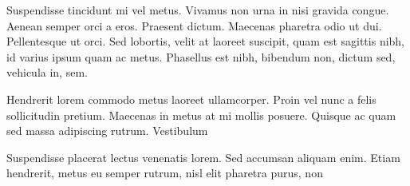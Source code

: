 \documentclass[article]{subfile}
\begin{document}

\begin{float}
	Suspendisse tincidunt mi vel metus. Vivamus non urna in nisi gravida congue. Aenean semper orci a eros. Praesent dictum. Maecenas pharetra odio ut dui. Pellentesque ut orci. Sed lobortis, velit at laoreet suscipit, quam est sagittis nibh, id varius ipsum quam ac metus. Phasellus est nibh, bibendum non, dictum sed, vehicula in, sem.


	Hendrerit lorem commodo metus laoreet ullamcorper. Proin vel nunc a felis sollicitudin pretium.
	Maecenas in metus at mi mollis posuere. Quisque ac quam sed massa adipiscing rutrum. Vestibulum

	Suspendisse placerat lectus venenatis lorem. Sed accumsan aliquam enim.
	Etiam hendrerit, metus eu semper rutrum, nisl elit pharetra purus, non


\end{float}
\end{document}
